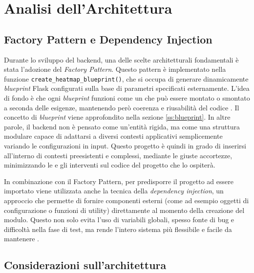 \section{Analisi dell'Architettura}
\label{ch:backend-architecture}

\subsection{Factory Pattern e Dependency Injection}

Durante lo sviluppo del backend, una delle scelte architetturali fondamentali è stata
l'adozione del \emph{Factory Pattern}. Questo pattern è implementato nella funzione
\texttt{create\_heatmap\_blueprint()}, che si occupa di generare dinamicamente \textit{blueprint}
Flask configurati sulla base di parametri specificati esternamente. L'idea di fondo
è che ogni \textit{blueprint} funzioni come un  che può
essere montato o smontato a seconda delle esigenze, mantenendo però coerenza e
riusabilità del codice \cite{app-factories}. Il concetto di \textit{blueprint}
viene approfondito nella sezione \ref{ss:blueprint}. In altre parole, il backend
non è pensato come un'entità rigida, ma come una struttura modulare capace di adattarsi
a diversi contesti applicativi semplicemente variando le configurazioni in input.
Questo progetto è quindi in grado di inserirsi all'interno di contesti
preesistenti e complessi, mediante le giuste accortezze, minimizzando le 
e gli interventi sul codice del progetto che lo ospiterà.

In combinazione con il Factory Pattern, per predisporre il progetto ad essere
importato  viene utilizzata anche la tecnica della \emph{dependency
injection}, un approccio che permette di fornire componenti esterni (come ad
esempio oggetti di configurazione o funzioni di utility) direttamente al momento
della creazione del modulo. Questo non solo evita l'uso di variabili globali, spesso
fonte di bug e difficoltà nella fase di test, ma rende l'intero sistema più
flessibile e facile da mantenere \cite{dependency-injection-wiki,flask-di}.









\subsection{Considerazioni sull'architettura}

